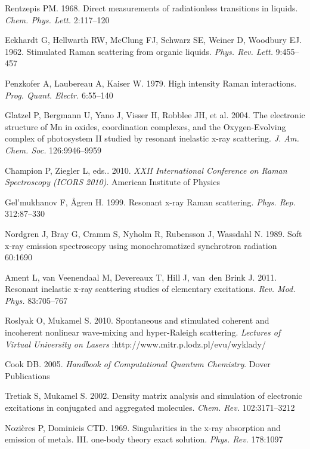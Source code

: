 \documentclass{ar-1col}
\begin{document}
\begin{thebibliography}{000}
Rentzepis PM. 1968. Direct measurements of radiationless transitions in
  liquids. \textit{Chem. Phys. Lett.} 2:117--120

Eckhardt G, Hellwarth RW, {McClung} FJ, Schwarz SE, Weiner D, Woodbury EJ.
  1962. Stimulated {R}aman scattering from organic liquids. \textit{Phys. Rev.
  Lett.} 9:455--457

Penzkofer A, Laubereau A, Kaiser W. 1979. High intensity {R}aman interactions.
  \textit{Prog. Quant. Electr.} 6:55--140

Glatzel P, Bergmann U, Yano J, Visser H, Robblee JH, et al. 2004. The electronic
  structure of {Mn} in oxides, coordination complexes, and the
  {Oxygen-Evolving} complex of photosystem {II} studied by resonant inelastic
  x-ray scattering. \textit{J. Am. Chem. Soc.} 126:9946--9959

Champion P, Ziegler L, eds.. 2010. \textit{XXII International Conference on
  {R}aman Spectroscopy (ICORS 2010)}. American Institute of Physics

Gel'mukhanov F, {\AA}gren H. 1999. Resonant x-ray {R}aman scattering.
  \textit{Phys. Rep.} 312:87--330

Nordgren J, Bray G, Cramm S, Nyholm R, Rubensson J, Wassdahl N. 1989. Soft
  x-ray emission spectroscopy using monochromatized synchrotron radiation
  60:1690

Ament L, van Veenendaal M, Devereaux T, Hill J, van~den Brink J. 2011. Resonant
  inelastic x-ray scattering studies of elementary excitations. \textit{Rev.
  Mod. Phys.} 83:705--767

Roslyak O, Mukamel S. 2010. Spontaneous and stimulated coherent and incoherent
  nonlinear wave-mixing and hyper-{R}aleigh scattering. \textit{Lectures of
  Virtual University on Lasers} :http://www.mitr.p.lodz.pl/evu/wyklady/

Cook DB. 2005. \textit{Handbook of Computational Quantum Chemistry}. Dover
  Publications

Tretiak S, Mukamel S. 2002. Density matrix analysis and simulation of
  electronic excitations in conjugated and aggregated molecules. \textit{Chem.
  Rev.} 102:3171--3212

{Nozi\`{e}res} P, {Dominicis} CTD. 1969. Singularities in the {x-ray}
  absorption and emission of metals. {III.} {one-body} theory exact solution.
  \textit{Phys. Rev.} 178:1097


\end{thebibliography}
\end{document}
